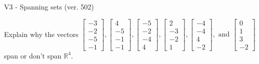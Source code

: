 \begin{exercise}
  \begin{exerciseTitle}V3 - Spanning sets (ver. 502)\end{exerciseTitle}
  \begin{exerciseStatement}
    Explain why the vectors \(\left[\begin{array}{r}
-3 \\
-2 \\
-5 \\
-1
\end{array}\right] , \left[\begin{array}{r}
4 \\
-5 \\
-1 \\
-1
\end{array}\right] , \left[\begin{array}{r}
-5 \\
-2 \\
-4 \\
4
\end{array}\right] , \left[\begin{array}{r}
2 \\
-3 \\
-2 \\
1
\end{array}\right] , \left[\begin{array}{r}
-4 \\
-4 \\
4 \\
-2
\end{array}\right] , \text{ and } \left[\begin{array}{r}
0 \\
1 \\
3 \\
-2
\end{array}\right]\) span or don't span \(\mathbb{R}^4\). 
	



\end{exerciseStatement}
\end{exercise}
